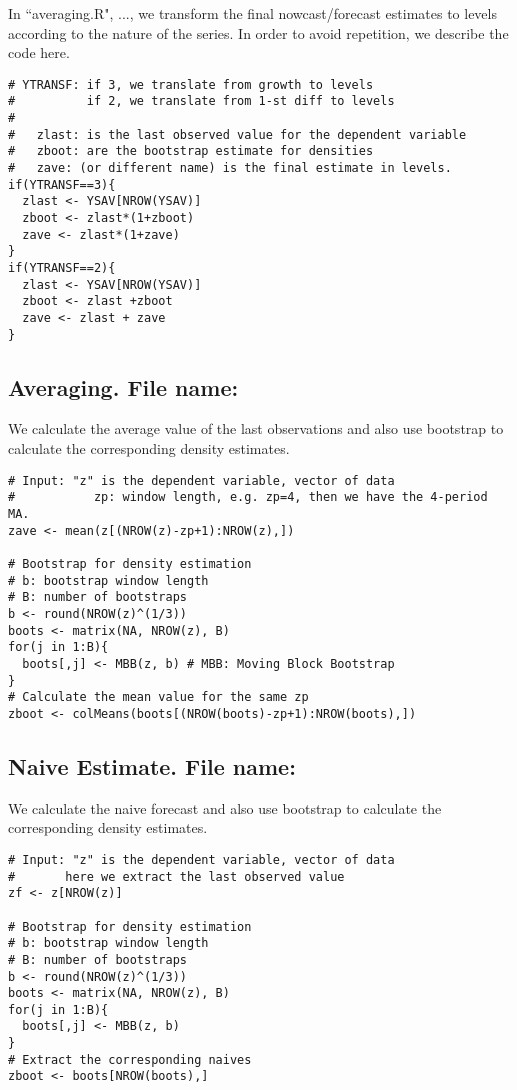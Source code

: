 \documentclass[12pt]{article}
\begin{document}
In ``averaging.R", ..., we transform the final nowcast/forecast estimates to
levels according to the nature of the series. In order to avoid repetition,
we describe the code here.

\begin{lstlisting}[title=\textbf{From Change to Levels.}]
# YTRANSF: if 3, we translate from growth to levels
#		   if 2, we translate from 1-st diff to levels
#
#	zlast: is the last observed value for the dependent variable
#	zboot: are the bootstrap estimate for densities
# 	zave: (or different name) is the final estimate in levels.
if(YTRANSF==3){
  zlast <- YSAV[NROW(YSAV)]
  zboot <- zlast*(1+zboot)
  zave <- zlast*(1+zave)
}
if(YTRANSF==2){
  zlast <- YSAV[NROW(YSAV)]
  zboot <- zlast +zboot
  zave <- zlast + zave
}
\end{lstlisting}

\subsection{Averaging. File name: \color{blue}{averaging.R}}

We calculate the average value of the last observations and also use bootstrap
to calculate the corresponding density estimates.

\begin{lstlisting}[title=\textbf{Averaging and Bootstrap for Density.}]
# Input: "z" is the dependent variable, vector of data
#			zp: window length, e.g. zp=4, then we have the 4-period MA.
zave <- mean(z[(NROW(z)-zp+1):NROW(z),])

# Bootstrap for density estimation
# b: bootstrap window length
# B: number of bootstraps
b <- round(NROW(z)^(1/3))
boots <- matrix(NA, NROW(z), B)
for(j in 1:B){
  boots[,j] <- MBB(z, b) # MBB: Moving Block Bootstrap
}
# Calculate the mean value for the same zp
zboot <- colMeans(boots[(NROW(boots)-zp+1):NROW(boots),])
\end{lstlisting}

\subsection{Naive Estimate. File name: \color{blue}{naive.R}}

We calculate the naive forecast and also use bootstrap to calculate the
corresponding density estimates.

\begin{lstlisting}[title=\textbf{Naive Forecasting.}]
# Input: "z" is the dependent variable, vector of data
# 		here we extract the last observed value
zf <- z[NROW(z)]

# Bootstrap for density estimation
# b: bootstrap window length
# B: number of bootstraps
b <- round(NROW(z)^(1/3))
boots <- matrix(NA, NROW(z), B)
for(j in 1:B){
  boots[,j] <- MBB(z, b)
}
# Extract the corresponding naives
zboot <- boots[NROW(boots),]
\end{lstlisting}
\end{document}

